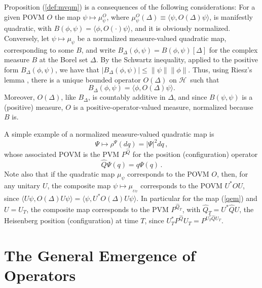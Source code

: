 \documentclass[12pt]{article}
\newcommand{\eq}[1]{(\ref{#1})}
\renewcommand{\H}{\mbox{$\mathcal{H}$}}
\newcommand{\norm}{\|}
\begin{document}
Proposition (\ref{def:mvqm}) is a consequences of the following
considerations: For a given POVM $O$ the map $\psi \mapsto
\mu_{\psi}^O$, where $ \mu^O_\psi (\Delta) \equiv \langle\psi ,
O(\Delta)\psi\rangle$, is manifestly quadratic, with $B(\phi,\psi) =
\langle\phi , O(\cdot)\psi\rangle$, and it is obviously normalized.
Conversely, let $\psi \mapsto \mu_{\psi}$ be a normalized
measure-valued quadratic map, corresponding to some $B$, and write
$B_\Delta (\phi,\psi)= B (\phi,\psi)[\Delta]$ for the complex measure
$B$ at the Borel set $\Delta$.  By the Schwartz inequality, applied to
the positive form $ B_\Delta (\phi,\psi) $, we have that $ |B_\Delta
(\phi,\psi)|\le \norm\psi\norm \norm\phi\norm $. Thus, using Riesz's
lemma \cite{RS80}, there is a unique bounded operator $ O(\Delta)$ on
\H\ such that
$$
B_\Delta(\phi,\psi) = \langle\phi, O(\Delta)\psi\rangle .
$$
Moreover, $ O(\Delta) $, like $B_\Delta$, is countably additive in
$\Delta$, and since $B (\psi,\psi)$ is a (positive) measure, $O$ is a
positive-operator-valued measure, normalized because $B$ is.


A simple example of a normalized measure-valued quadratic map is
\begin{equation}
\label{qem}
\Psi\mapsto \rho^{\Psi} (dq) = |\Psi|^2 dq \, ,
\end{equation}
whose associated POVM is the PVM $P^{\hat{Q}}$ for the position
(configuration) operator
\begin{equation}
{\hat Q}\Psi(q) = q\Psi(q)\,.
\label{eq:posiope}
\end{equation}
Note also that if the quadratic map $\mu_\psi$ corresponds to the POVM
$O$, then, for any unitary $U$, the composite map
$\psi\mapsto\mu_{_{U\psi}}$ corresponds to the POVM $U^*OU$, since $
\langle U\psi, O(\Delta)U\psi\rangle = \langle\psi,
U^*O(\Delta)U\psi\rangle$.  In particular for the map \eq{qem} and
$U=U_T$, the composite map corresponds to the PVM $P^{\hat{Q}_T}$,
with $ \hat{Q}_T= U^*\hat{Q} U $, the Heisenberg position
(configuration) at time $T$, since $ U_T^* P^{\hat{Q}} U_T = P^{U_T^*
   \hat{Q} U_T } $.


\section{The General Emergence of Operators}\label{secGEO}\label{5}
\setcounter{equation}{0} \label{GEBM}
\end{document}

